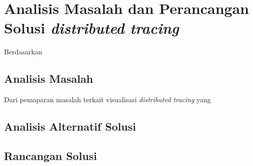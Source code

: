 \chapter{Analisis Masalah dan Perancangan Solusi \textit{distributed tracing}}

Berdasarkan 


\section{Analisis Masalah}

Dari pemaparan masalah terkait visualisasi \textit{distributed tracing} yang 




\section{Analisis Alternatif Solusi}

\section{Rancangan Solusi}


